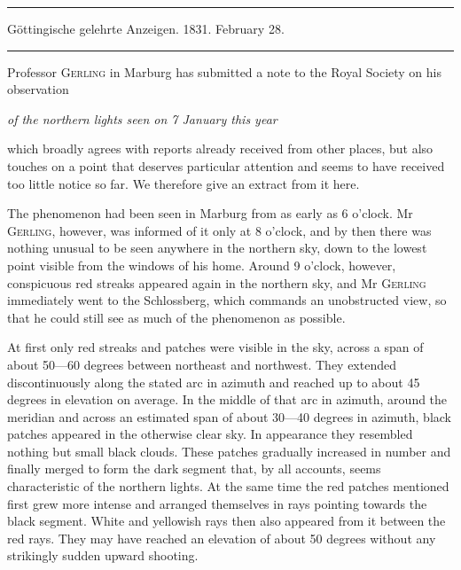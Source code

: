 \begin{center}
\hrule\vspace{2mm}
Göttingische gelehrte Anzeigen. 1831. February 28.
\vspace{2mm}\hrule\vspace{5mm}
\end{center}
Professor \textsc{Gerling} in Marburg has submitted a note to the Royal Society on his observation
\begin{center}\itshape of the northern lights seen on 7 January this year\end{center}
\noindent which broadly agrees with reports already received from other places, but also touches on a point that deserves particular attention and seems to have received too little notice so far. We therefore give an extract from it here.

The phenomenon had been seen in Marburg from as early as 6 o'clock. Mr \textsc{Gerling}, however, was informed of it only at 8 o'clock, and by then there was nothing unusual to be seen anywhere in the northern sky, down to the lowest point visible from the windows of his home. Around 9 o'clock, however, conspicuous red streaks appeared again in the northern sky, and Mr \textsc{Gerling} immediately went to the Schlossberg, which commands an unobstructed view, so that he could still see as much of the phenomenon as possible.

At first only red streaks and patches were visible in the sky, across a span of about 50—60 degrees between northeast and northwest. They extended discontinuously along the stated arc in azimuth and reached up to about 45 degrees in elevation on average. In the middle of that arc in azimuth, around the meridian and across an estimated span of about 30—40 degrees in azimuth, black patches appeared in the otherwise clear sky. In appearance they resembled nothing but small black clouds. These patches gradually increased in number and finally merged to form the dark segment that, by all accounts, seems characteristic of the northern lights. At the same time the red patches mentioned first grew more intense and arranged themselves in rays pointing towards the black segment. White and yellowish rays then also appeared from it between the red rays. They may have reached an elevation of about 50 degrees without any strikingly sudden upward shooting.

